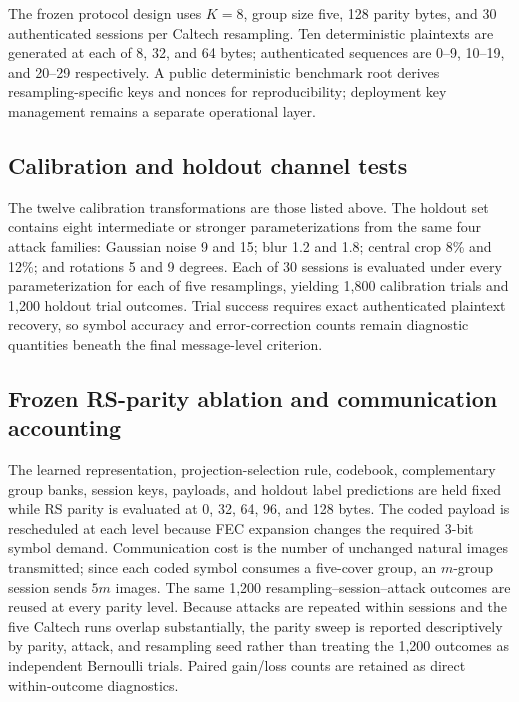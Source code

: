 The frozen protocol design uses $K=8$, group size five, 128 parity bytes, and 30 authenticated sessions per Caltech resampling. Ten deterministic plaintexts are generated at each of 8, 32, and 64 bytes; authenticated sequences are 0--9, 10--19, and 20--29 respectively. A public deterministic benchmark root derives resampling-specific keys and nonces for reproducibility; deployment key management remains a separate operational layer.

\subsection{Calibration and holdout channel tests}
The twelve calibration transformations are those listed above. The holdout set contains eight intermediate or stronger parameterizations from the same four attack families: Gaussian noise 9 and 15; blur 1.2 and 1.8; central crop 8\% and 12\%; and rotations 5 and 9 degrees. Each of 30 sessions is evaluated under every parameterization for each of five resamplings, yielding 1,800 calibration trials and 1,200 holdout trial outcomes. Trial success requires exact authenticated plaintext recovery, so symbol accuracy and error-correction counts remain diagnostic quantities beneath the final message-level criterion.

\subsection{Frozen RS-parity ablation and communication accounting}
The learned representation, projection-selection rule, codebook, complementary group banks, session keys, payloads, and holdout label predictions are held fixed while RS parity is evaluated at 0, 32, 64, 96, and 128 bytes. The coded payload is rescheduled at each level because FEC expansion changes the required 3-bit symbol demand. Communication cost is the number of unchanged natural images transmitted; since each coded symbol consumes a five-cover group, an $m$-group session sends $5m$ images. The same 1,200 resampling--session--attack outcomes are reused at every parity level. Because attacks are repeated within sessions and the five Caltech runs overlap substantially, the parity sweep is reported descriptively by parity, attack, and resampling seed rather than treating the 1,200 outcomes as independent Bernoulli trials. Paired gain/loss counts are retained as direct within-outcome diagnostics.

